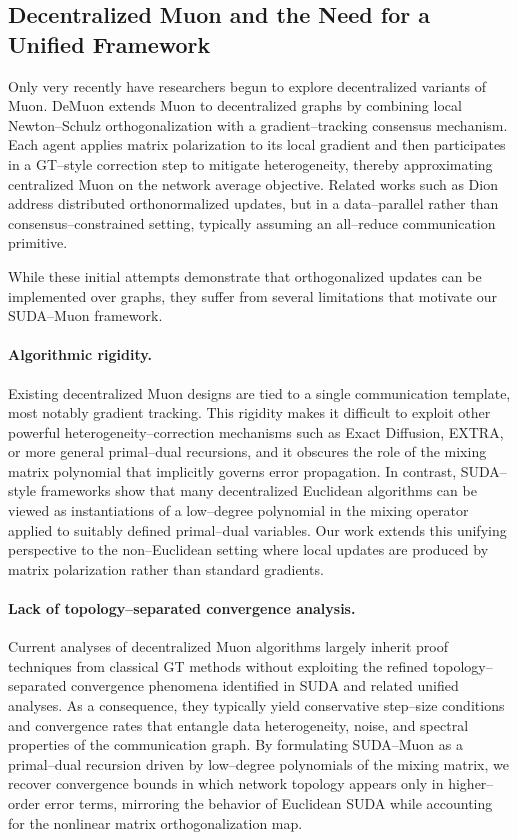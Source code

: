 \subsection{Decentralized Muon and the Need for a Unified Framework}

Only very recently have researchers begun to explore decentralized variants of Muon. DeMuon extends Muon to decentralized graphs by combining local Newton–Schulz orthogonalization with a gradient–tracking consensus mechanism. Each agent applies matrix polarization to its local gradient and then participates in a GT–style correction step to mitigate heterogeneity, thereby approximating centralized Muon on the network average objective. Related works such as Dion address distributed orthonormalized updates, but in a data–parallel rather than consensus–constrained setting, typically assuming an all–reduce communication primitive.

While these initial attempts demonstrate that orthogonalized updates can be implemented over graphs, they suffer from several limitations that motivate our SUDA–Muon framework.

\paragraph{Algorithmic rigidity.}
Existing decentralized Muon designs are tied to a single communication template, most notably gradient tracking. This rigidity makes it difficult to exploit other powerful heterogeneity–correction mechanisms such as Exact Diffusion, EXTRA, or more general primal–dual recursions, and it obscures the role of the mixing matrix polynomial that implicitly governs error propagation. In contrast, SUDA–style frameworks show that many decentralized Euclidean algorithms can be viewed as instantiations of a low–degree polynomial in the mixing operator applied to suitably defined primal–dual variables. Our work extends this unifying perspective to the non–Euclidean setting where local updates are produced by matrix polarization rather than standard gradients.

\paragraph{Lack of topology–separated convergence analysis.}
Current analyses of decentralized Muon algorithms largely inherit proof techniques from classical GT methods without exploiting the refined topology–separated convergence phenomena identified in SUDA and related unified analyses. As a consequence, they typically yield conservative step–size conditions and convergence rates that entangle data heterogeneity, noise, and spectral properties of the communication graph. By formulating SUDA–Muon as a primal–dual recursion driven by low–degree polynomials of the mixing matrix, we recover convergence bounds in which network topology appears only in higher–order error terms, mirroring the behavior of Euclidean SUDA while accounting for the nonlinear matrix orthogonalization map.

